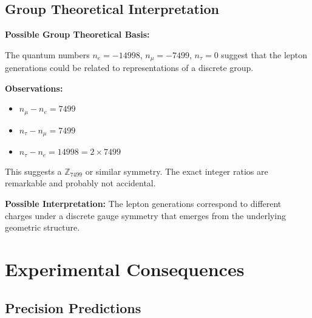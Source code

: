 \documentclass[12pt,a4paper]{article}
\begin{document}
	\subsection{Group Theoretical Interpretation}
	
	\begin{treatise}
		\textbf{Possible Group Theoretical Basis:}
		
		The quantum numbers $n_e = -14998$, $n_\mu = -7499$, $n_\tau = 0$ suggest that the lepton generations could be related to representations of a discrete group.
		
		\textbf{Observations:}
		\begin{itemize}
			\item $n_\mu - n_e = 7499$
			\item $n_\tau - n_\mu = 7499$
			\item $n_\tau - n_e = 14998 = 2 \times 7499$
		\end{itemize}
		
		This suggests a $\mathbb{Z}_{7499}$ or similar symmetry. The exact integer ratios are remarkable and probably not accidental.
		
		\textbf{Possible Interpretation:}
		The lepton generations correspond to different charges under a discrete gauge symmetry that emerges from the underlying geometric structure.
	\end{treatise}
	
	
	\section{Experimental Consequences}
	
	\subsection{Precision Predictions}
	
\end{document}
